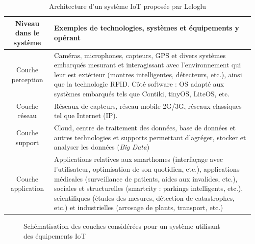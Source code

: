 \documentclass[]{article}
\begin{document}
\begin{table}[!ht]
    \center
    \begin{tabular}[b]{|c|p{12cm}|}
    \hline
		Niveau dans le système &  Exemples de technologies, systèmes et équipements y opérant\\
	\hline
Couche perception & Caméras, microphones, capteurs, GPS et divers systèmes embarqués mesurant et interagissant avec l'environnement qui leur est extérieur (montres intelligentes, détecteurs, etc.), ainsi que la technologie RFID. Côté software : OS adapté aux systèmes embarqués tels que Contiki, tinyOS, LiteOS, etc.\\
	\hline
Couche réseau & Réseaux de capteurs, réseau mobile 2G/3G, réseaux classiques tel que Internet (IP).\\
	\hline
Couche support & Cloud, centre de traitement des données, base de données et autres technologies et supports permettant d’agréger, stocker et analyser les données (\textit{Big Data})\\
	\hline
Couche application & Applications relatives aux smarthomes (interfaçage avec l'utilisateur, optimisation de son quotidien, etc.), applications médicales (surveillance de patients, aides aux invalides, etc.), sociales et structurelles (smartcity : parkings intelligents, etc.), scientifiques (études des mesures, détection de catastrophes, etc.) et industrielles (arrosage de plants, transport, etc.)\\   
  \hline
    \end{tabular}
    \caption{Architecture d'un système IoT proposée par Leloglu \cite{Leloglu2017}}
    \label{IoT_model_desc}
\end{table}

\newpage

    \begin{figure}[!h]
       \noindent{}
       \caption{Schématisation des couches considérées pour un système utilisant des équipements IoT}
       \label{IoT_model_scheme}
    \end{figure}
    
\end{document}
